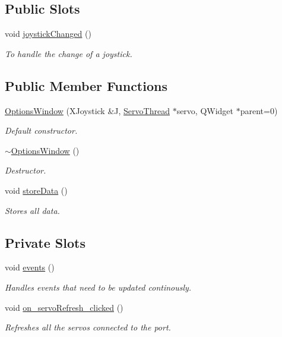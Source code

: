 \subsection*{Public Slots}
\begin{DoxyCompactItemize}
\item 
void \hyperlink{class_options_window_ae8c0373be58da710194f8d14f1c3c4dc}{joystick\+Changed} ()
\begin{DoxyCompactList}\small\item\em To handle the change of a joystick. \end{DoxyCompactList}\end{DoxyCompactItemize}
\subsection*{Public Member Functions}
\begin{DoxyCompactItemize}
\item 
\hyperlink{class_options_window_ae8e0a610d13a0478bdac57ec7cd4afba}{Options\+Window} (X\+Joystick \&J, \hyperlink{class_servo_thread}{Servo\+Thread} $\ast$servo, Q\+Widget $\ast$parent=0)
\begin{DoxyCompactList}\small\item\em Default constructor. \end{DoxyCompactList}\item 
\hyperlink{class_options_window_a034c885fe8bb4416e732a9571d14a6b4}{$\sim$\+Options\+Window} ()
\begin{DoxyCompactList}\small\item\em Destructor. \end{DoxyCompactList}\item 
void \hyperlink{class_options_window_ab0a56ad7347c20046602a7a2a1c83397}{store\+Data} ()
\begin{DoxyCompactList}\small\item\em Stores all data. \end{DoxyCompactList}\end{DoxyCompactItemize}
\subsection*{Private Slots}
\begin{DoxyCompactItemize}
\item 
void \hyperlink{class_options_window_a18763ff318688083c7ee5a21f22e8e98}{events} ()
\begin{DoxyCompactList}\small\item\em Handles events that need to be updated continously. \end{DoxyCompactList}\item 
void \hyperlink{class_options_window_ad5365d452e8bcd86cbb64b9ec42c3b7e}{on\+\_\+servo\+Refresh\+\_\+clicked} ()
\begin{DoxyCompactList}\small\item\em Refreshes all the servos connected to the port. \end{DoxyCompactList}\end{DoxyCompactItemize}
